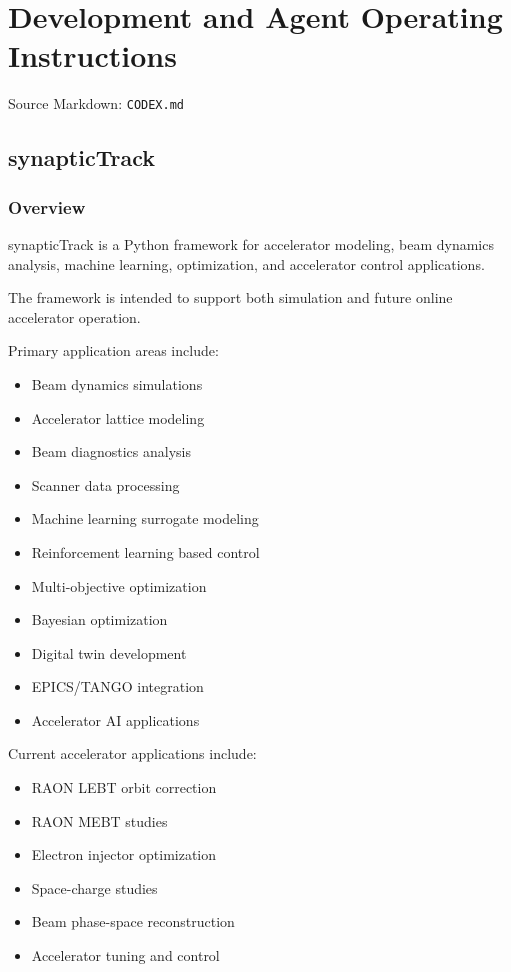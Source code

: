 \documentclass[
]{article}
\providecommand{\tightlist}{%
  \setlength{\itemsep}{0pt}\setlength{\parskip}{0pt}}
\begin{document}
\hypertarget{development-and-agent-operating-instructions}{%
\section{Development and Agent Operating
Instructions}\label{development-and-agent-operating-instructions}}

Source Markdown: \texttt{CODEX.md}

\hypertarget{synaptictrack-1}{%
\subsection{synapticTrack}\label{synaptictrack-1}}

\hypertarget{overview}{%
\subsubsection{Overview}\label{overview}}

synapticTrack is a Python framework for accelerator modeling, beam
dynamics analysis, machine learning, optimization, and accelerator
control applications.

The framework is intended to support both simulation and future online
accelerator operation.

Primary application areas include:

\begin{itemize}
\tightlist
\item
  Beam dynamics simulations
\item
  Accelerator lattice modeling
\item
  Beam diagnostics analysis
\item
  Scanner data processing
\item
  Machine learning surrogate modeling
\item
  Reinforcement learning based control
\item
  Multi-objective optimization
\item
  Bayesian optimization
\item
  Digital twin development
\item
  EPICS/TANGO integration
\item
  Accelerator AI applications
\end{itemize}

Current accelerator applications include:

\begin{itemize}
\tightlist
\item
  RAON LEBT orbit correction
\item
  RAON MEBT studies
\item
  Electron injector optimization
\item
  Space-charge studies
\item
  Beam phase-space reconstruction
\item
  Accelerator tuning and control
\end{itemize}
\end{document}

